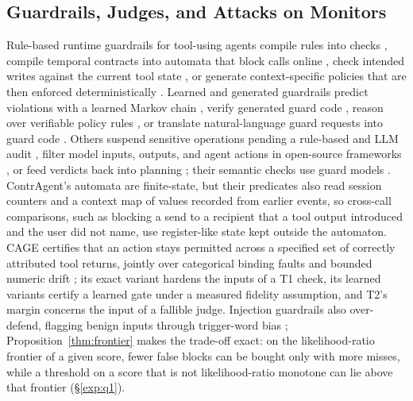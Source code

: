 \subsection{Guardrails, Judges, and Attacks on Monitors}
Rule-based runtime guardrails for tool-using agents compile rules into checks
\citep{agentspec2026,agentc2025}, compile temporal contracts into automata that block calls
online \citep{xiao2026contragent}, check intended writes against the current tool state
\citep{reddy2026reasonless}, or generate context-specific policies that are then enforced
deterministically \citep{tsai2025conseca}. Learned and generated guardrails predict violations
with a learned Markov chain \citep{probguard2025}, verify generated guard code
\citep{veriguard2025}, reason over verifiable policy rules \citep{shieldagent2025}, or translate
natural-language guard requests into guard code \citep{guardagent2024}. Others suspend sensitive
operations pending a rule-based and LLM audit \citep{hu2025agentsentinel}, filter model inputs,
outputs, and agent actions in open-source frameworks
\citep{rebedea2023nemo,chennabasappa2025llamafirewall}, or feed verdicts back into planning
\citep{mou2026toolsafe,sun2026triad,li2025drift}; their semantic checks use guard models
\citep{inan2023llamaguard,han2024wildguard,liu2026agentdog}. ContrAgent's automata
are finite-state, but their predicates also read session counters and a context map of values
recorded from earlier events, so cross-call comparisons, such as blocking a send to a recipient
that a tool output introduced and the user did not name, use register-like state kept outside
the automaton. CAGE
certifies that an action stays permitted across a specified set of correctly attributed tool
returns, jointly over categorical binding faults and bounded numeric drift
\citep{delattre2026cage}; its exact variant hardens the inputs of a T1 check, its learned
variants certify a learned gate under a measured fidelity assumption, and T2's margin concerns the
input of a fallible judge. Injection guardrails also over-defend, flagging benign inputs through
trigger-word bias \citep{li2025piguard}; Proposition~\ref{thm:frontier} makes the trade-off exact:
on the likelihood-ratio frontier of a given score, fewer false blocks can be bought only with more
misses, while a threshold on a score that is not likelihood-ratio monotone can lie above that
frontier (\S\ref{exp:q1}).

